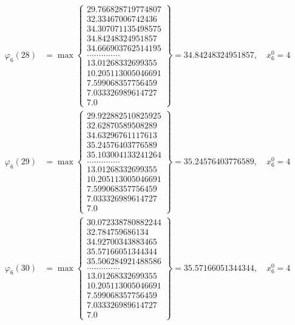\documentclass{article}
\begin{document}
\begin{align*}
  
  
  
\varphi_{6}(28) &= \max \left\{ \begin{array}{c}
29.766828719774807 \\
 32.33467006742436 \\
 34.307071135498575 \\
 34.84248324951857 \\
 34.666903762514195 \\
 .............. \\
 13.01268332699355 \\
 10.205113005046691 \\
 7.599068357756459 \\
 7.033326989614727 \\
 7.0
\end{array} \right\} = 34.84248324951857, \quad x_{6}^0 = 4\\
  
  
  
  
\varphi_{6}(29) &= \max \left\{ \begin{array}{c}
29.922882510825925 \\
 32.62870589508289 \\
 34.63296761117613 \\
 35.24576403776589 \\
 35.103004133241264 \\
 .............. \\
 13.01268332699355 \\
 10.205113005046691 \\
 7.599068357756459 \\
 7.033326989614727 \\
 7.0
\end{array} \right\} = 35.24576403776589, \quad x_{6}^0 = 4\\
  
  
  
  
\varphi_{6}(30) &= \max \left\{ \begin{array}{c}
30.072338780882244 \\
 32.784759686134 \\
 34.92700343883465 \\
 35.57166051344344 \\
 35.506284921488586 \\
 .............. \\
 13.01268332699355 \\
 10.205113005046691 \\
 7.599068357756459 \\
 7.033326989614727 \\
 7.0
\end{array} \right\} = 35.57166051344344, \quad x_{6}^0 = 4\\
  

\end{align*}
\end{document}
